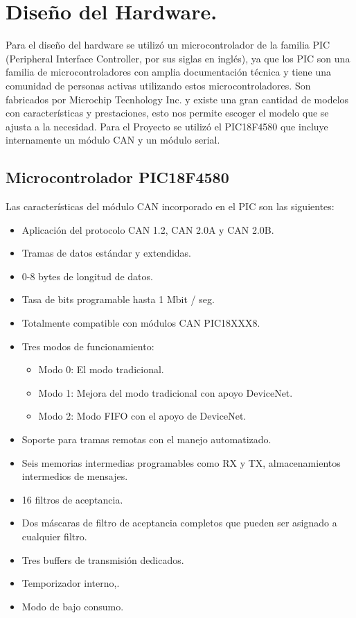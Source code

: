\chapter[Capítulo 4. Diseño del Hardware ]{Diseño del Hardware.}

Para el diseño del hardware se utilizó un microcontrolador de la familia PIC (Peripheral Interface Controller, por sus siglas en inglés), ya que los PIC son una familia de microcontroladores con amplia documentación técnica y tiene una comunidad de personas activas utilizando estos microcontroladores. Son fabricados por Microchip Tecnhology Inc. y existe una gran cantidad de modelos con características y prestaciones, esto nos permite escoger el modelo que se ajusta a la necesidad. Para el Proyecto se utilizó el PIC18F4580 que incluye internamente un módulo CAN y un módulo serial. 
\section{Microcontrolador PIC18F4580}

Las características del módulo CAN incorporado en el PIC son las siguientes:
\begin{itemize}
	\item Aplicación del protocolo CAN 1.2,
	CAN 2.0A y CAN 2.0B.
	\item Tramas de datos estándar y extendidas.
	\item 0-8 bytes de longitud de datos.
	\item Tasa de bits programable hasta 1 Mbit / seg.
	\item Totalmente compatible con módulos CAN PIC18XXX8.
	\item Tres modos de funcionamiento:
	\begin{itemize}
		\item Modo 0: El modo tradicional.
		\item Modo 1: Mejora del modo tradicional con
		apoyo DeviceNet.
		\item Modo 2: Modo FIFO con el apoyo de DeviceNet.
		\end {itemize}
		\item Soporte para tramas remotas con el manejo automatizado.
		\item  Seis memorias intermedias programables como RX y TX, 
		almacenamientos intermedios de mensajes.
		\item 16 filtros de aceptancia.
		\item Dos máscaras de filtro de aceptancia completos que pueden ser asignado a cualquier filtro.
		\item Tres buffers de transmisión dedicados.
		\item Temporizador interno,\cite{DaP}.
		\item Modo de bajo consumo.
	\end{itemize}


